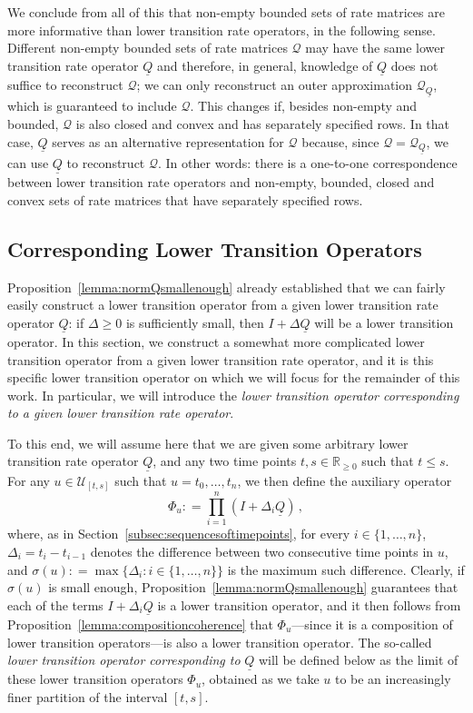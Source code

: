 \documentclass[10pt,a4paper]{paper}
\theoremstyle{definition}
\newcommand{\reals}{\mathbb{R}}
\newcommand{\realsnonneg}{\reals_{\geq 0}}
\newcommand{\rateset}{\mathcal{Q}}
\newcommand{\lrate}{\underline{Q}}
\newcommand{\coloneqq}{:\!=}
\begin{document}
We conclude from all of this that non-empty bounded sets of rate matrices are more informative than lower transition rate operators, in the following sense. Different non-empty bounded sets of rate matrices $\rateset$ may have the same lower transition rate operator $\lrate$ and therefore, in general, knowledge of $\lrate$ does not suffice to reconstruct $\rateset$; we can only reconstruct an outer approximation $\rateset_{\lrate}$, which is guaranteed to include $\rateset$. This changes if, besides non-empty and bounded, $\rateset$ is also closed and convex and has separately specified rows. In that case, $\lrate$ serves as an alternative representation for $\rateset$ because, since $\rateset=\rateset_{\lrate}$, we can use $\lrate$ to reconstruct $\rateset$. In other words: there is a one-to-one correspondence between lower transition rate operators and non-empty, bounded, closed and convex sets of rate matrices that have separately specified rows.



\subsection{Corresponding Lower Transition Operators}

Proposition~\ref{lemma:normQsmallenough} already established that we can fairly easily construct a lower transition operator from a given lower transition rate operator $\lrate$: if $\Delta\geq0$ is sufficiently small, then $I+\Delta\lrate$ will be a lower transition operator. In this section, we construct a somewhat more complicated lower transition operator from a given lower transition rate operator, and it is this specific lower transition operator on which we will focus for the remainder of this work. In particular, we will introduce the \emph{lower transition operator corresponding to a given lower transition rate operator}.

To this end, we will assume here that we are given some arbitrary lower transition rate operator $\lrate$, and any two time points $t,s\in\realsnonneg$ such that $t\leq s$. For any $u\in\mathcal{U}_{[t,s]}$ such that $u=t_0,\ldots,t_n$, we then define the auxiliary operator
\begin{equation}\label{eq:aux_lower_trans}
\Phi_u\coloneqq\prod_{i=1}^n(I+\Delta_i\lrate)\,,
\end{equation}
where, as in Section~\ref{subsec:sequencesoftimepoints}, for every $i\in\{1,\ldots,n\}$, $\Delta_i= t_i-t_{i-1}$ denotes the difference between two consecutive time points in $u$, and $\sigma(u)\coloneqq \max\{\Delta_i:i\in\{1,\ldots,n\}\}$ is the maximum such difference. Clearly, if $\sigma(u)$ is small enough, Proposition~\ref{lemma:normQsmallenough} guarantees that each of the terms $I+\Delta_i\lrate$ is a lower transition operator, and it then follows from Proposition~\ref{lemma:compositioncoherence} that $\Phi_u$---since it is a composition of lower transition operators---is also a lower transition operator. The so-called \emph{lower transition operator corresponding to} $\lrate$ will be defined below as the limit of these lower transition operators $\Phi_u$, obtained as we take $u$ to be an increasingly finer partition of the interval $[t,s]$.
\end{document}
